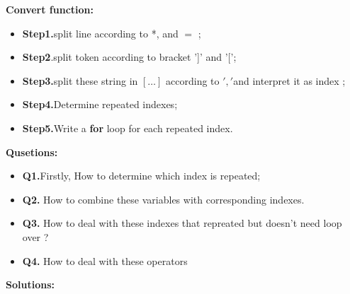 \documentclass{article}
\begin{document}
{\bfseries{Convert function:}}
\begin{itemize}
  \item {\bfseries{Step1.}}split line according to *, and $=$ ;
  
  \item {\bfseries{Step2}}.split token according to bracket ']' and '[';
  
  \item {\bfseries{Step3.}}split these string in $[\ldots]$ according to
  $','$and interpret it as index ;
  
  \item {\bfseries{Step4.}}Determine repeated indexes;
  
  \item {\bfseries{Step5.}}Write a {\bfseries{for}} loop for each repeated
  index.
\end{itemize}
{\bfseries{Qusetions:}}
\begin{itemize}
  \item {\bfseries{Q1.}}Firstly, How to determine which index is repeated;
  
  \item {\bfseries{Q2.}} How to combine these variables with corresponding
  indexes.
  
  \item {\bfseries{Q3.}} How to deal with these indexes that repreated but
  doesn't need loop over ?
  
  \item {\bfseries{Q4.}} How to deal with these operators 
\end{itemize}
{\bfseries{Solutions:}}
\end{document}
